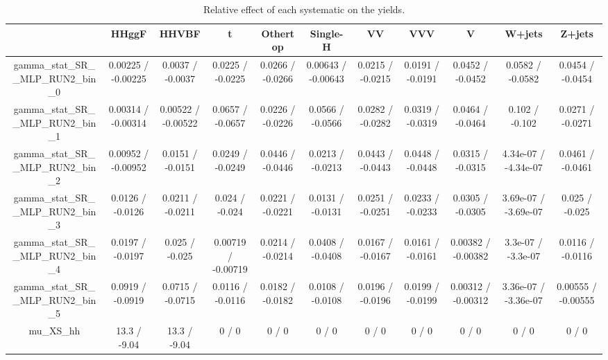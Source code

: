 \documentclass[10pt]{article}
\begin{document}
\begin{table}[htbp]
\begin{center}
\begin{tabular}{|c|c|c|c|c|c|c|c|c|c|c|}
\hline 
      & HHggF      & HHVBF      & t      & Othertop      & Single-H      & VV      & VVV      & V      & W+jets      & Z+jets \\ 
\hline 
  gamma_stat_SR__MLP_RUN2_bin_0 & 0.00225 / -0.00225 & 0.0037 / -0.0037 & 0.0225 / -0.0225 & 0.0266 / -0.0266 & 0.00643 / -0.00643 & 0.0215 / -0.0215 & 0.0191 / -0.0191 & 0.0452 / -0.0452 & 0.0582 / -0.0582 & 0.0454 / -0.0454 \\ 
  gamma_stat_SR__MLP_RUN2_bin_1 & 0.00314 / -0.00314 & 0.00522 / -0.00522 & 0.0657 / -0.0657 & 0.0226 / -0.0226 & 0.0566 / -0.0566 & 0.0282 / -0.0282 & 0.0319 / -0.0319 & 0.0464 / -0.0464 & 0.102 / -0.102 & 0.0271 / -0.0271 \\ 
  gamma_stat_SR__MLP_RUN2_bin_2 & 0.00952 / -0.00952 & 0.0151 / -0.0151 & 0.0249 / -0.0249 & 0.0446 / -0.0446 & 0.0213 / -0.0213 & 0.0443 / -0.0443 & 0.0448 / -0.0448 & 0.0315 / -0.0315 & 4.34e-07 / -4.34e-07 & 0.0461 / -0.0461 \\ 
  gamma_stat_SR__MLP_RUN2_bin_3 & 0.0126 / -0.0126 & 0.0211 / -0.0211 & 0.024 / -0.024 & 0.0221 / -0.0221 & 0.0131 / -0.0131 & 0.0251 / -0.0251 & 0.0233 / -0.0233 & 0.0305 / -0.0305 & 3.69e-07 / -3.69e-07 & 0.025 / -0.025 \\ 
  gamma_stat_SR__MLP_RUN2_bin_4 & 0.0197 / -0.0197 & 0.025 / -0.025 & 0.00719 / -0.00719 & 0.0214 / -0.0214 & 0.0408 / -0.0408 & 0.0167 / -0.0167 & 0.0161 / -0.0161 & 0.00382 / -0.00382 & 3.3e-07 / -3.3e-07 & 0.0116 / -0.0116 \\ 
  gamma_stat_SR__MLP_RUN2_bin_5 & 0.0919 / -0.0919 & 0.0715 / -0.0715 & 0.0116 / -0.0116 & 0.0182 / -0.0182 & 0.0108 / -0.0108 & 0.0196 / -0.0196 & 0.0199 / -0.0199 & 0.00312 / -0.00312 & 3.36e-07 / -3.36e-07 & 0.00555 / -0.00555 \\ 
  mu_XS_hh & 13.3 / -9.04 & 13.3 / -9.04 & 0 / 0 & 0 / 0 & 0 / 0 & 0 / 0 & 0 / 0 & 0 / 0 & 0 / 0 & 0 / 0 \\ 
\hline 
\end{tabular} 
\caption{Relative effect of each systematic on the yields.} 
\end{center} 
\end{table} 
\end{document}
